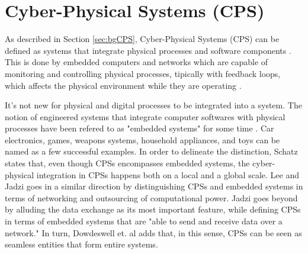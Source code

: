 




\section{Cyber-Physical Systems (CPS)}

As described in Section \ref{sec:bgCPS}, Cyber-Physical Systems (CPS) can be defined as systems that integrate physical processes and software components \cite{lee2008cyber}. This is done by embedded computers and networks which are capable of monitoring and controlling physical processes, tipically with feedback loops, which affects the physical environment while they are operating \cite{banerjee2011ensuring}.


It's not new for physical and digital processes to be integrated into a system. The notion of engineered systems that integrate computer softwares with physical processes have been refered to as "embedded systems" for some time \cite{lee2008cyber}. Car electronics, games, weapons systems, household appliances, and toys can be named as a few successful examples. In order to delineate the distinction, Schatz \cite{schatz2014role} states that, even though CPSs encompasses embedded systems, the cyber-physical integration in CPSs happens both on a local and a global scale. Lee \cite{lee2008cyber} and Jadzi \cite{jazdi2014cyber} goes in a similar direction by distinguishing CPSs and embedded systems in terms of networking and outsourcing of computational power. Jadzi \cite{jazdi2014cyber} goes beyond by alluding the data exchange as its most important feature, while defining CPSs in terms of embedded systems that are "able to send and receive data over a network." In turn, Dowdeswell et. al \cite{dowdeswell2020finding} adds that, in this sense, CPSs can be seen as seamless entities that form entire systems.

